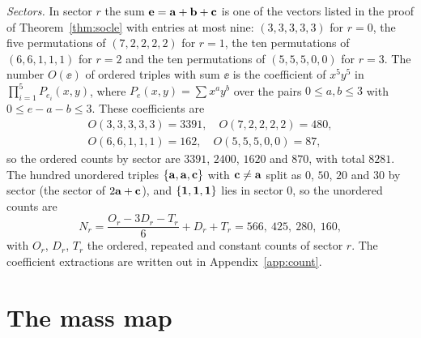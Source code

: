 \emph{Sectors.} In sector $r$ the sum $\mathbf{e}=\mathbf{a}+\mathbf{b}+\mathbf{c}$ is one of the
vectors listed in the proof of Theorem~\ref{thm:socle} with entries at most
nine: $(3,3,3,3,3)$ for $r=0$, the five permutations of $(7,2,2,2,2)$ for
$r=1$, the ten permutations of $(6,6,1,1,1)$ for $r=2$ and the ten
permutations of $(5,5,5,0,0)$ for $r=3$. The number $O(\ee)$ of ordered
triples with sum $\ee$ is the coefficient of $x^5y^5$ in
$\prod_{i=1}^5P_{e_i}(x,y)$, where $P_e(x,y)=\sum x^ay^b$ over the pairs
$0\le a,b\le3$ with $0\le e-a-b\le3$. These coefficients are
\begin{gather*}
O(3,3,3,3,3)=3391,\quad O(7,2,2,2,2)=480,\\
O(6,6,1,1,1)=162,\quad O(5,5,5,0,0)=87,
\end{gather*}
so the ordered counts by sector are $3391$, $2400$, $1620$ and $870$, with
total $8281$. The hundred unordered triples $\{\mathbf{a},\mathbf{a},\mathbf{c}\}$ with
$\mathbf{c}\ne\mathbf{a}$ split as $0$, $50$, $20$ and $30$ by sector (the sector of
$2\mathbf{a}+\mathbf{c}$), and $\{\mathbf{1},\mathbf{1},\mathbf{1}\}$ lies in sector $0$, so the unordered
counts are
\[
N_r=\frac{O_r-3D_r-T_r}{6}+D_r+T_r=566,\ 425,\ 280,\ 160,
\]
with $O_r$, $D_r$, $T_r$ the ordered, repeated and constant counts of
sector $r$. The coefficient extractions are written out in
Appendix~\ref{app:count}.

\section{The mass map}\label{sec:mass}

